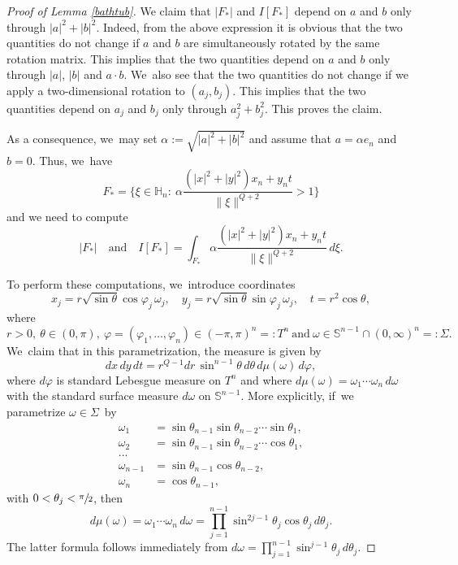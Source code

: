 \documentclass[11pt]{article}
\let\oldsfrac\sfrac
\renewcommand{\sfrac}[2]{{\oldsfrac{#1}{#2}}}
\theoremstyle{definition}
\let\phi\varphi
\newcommand{\1}{\mathbbm{1}}
\newcommand{\Sph}{\mathbb{S}}
\numberwithin{equation}{section}
\begin{document}
\begin{proof}[Proof of Lemma \ref{bathtub}]
We claim that $|F_*|$ and $I[F_*]$ depend on $a$ and $b$ only through $|a|^2+|b|^2$. Indeed, from the above expression it is obvious that the two quantities do not change if $a$ and $b$ are simultaneously rotated by the same rotation matrix. This implies that the two quantities depend on $a$ and $b$ only through $|a|$, $|b|$ and $a\cdot b$. We~also see that the two quantities do not change if we apply a two-dimensional rotation to $(a_j,b_j)$. This implies that the two quantities depend on $a_j$ and $b_j$ only through $a_j^2+b_j^2$. This proves the claim.

As a consequence, we~may set $\alpha:=\sqrt{|a|^2+|b|^2}$ and assume that $a=\alpha e_n$ and $b=0$. Thus, we~have
\[
F_* = \Big\{ \xi \in\mathbb H_n:\ \alpha \frac{(|x|^2+|y|^2)x_n + y_n t}{\|\xi\|^{Q+2}} >1 \Big\}
\]
and we need to compute
\[
|F_*|
\quad\text{and}\quad
I[F_*] = \int_{F_*} \alpha \frac{(|x|^2+|y|^2)x_n + y_n t}{\|\xi\|^{Q+2}} \,d\xi.
\]

To perform these computations, we~introduce coordinates
\[
x_j = r \sqrt{\sin\theta} \cos\phi_j \,\omega_j,
\quad
y_j = r \sqrt{\sin\theta} \sin\phi_j \,\omega_j,
\quad
t = r^2 \cos\theta,
\]
where
\[
r>0,\ \theta\in(0,\pi),\ \phi=(\phi_1,\ldots,\phi_n)\in(-\pi,\pi)^n=:T^n \ \text{and}\ \omega \in\Sph^{n-1}\cap(0,\infty)^n=:\Sigma.
\]
We~claim that in this parametrization, the measure is given by
\begin{equation}
\label{eq:measure}
dx\,dy\,dt = r^{Q-1}dr\,\sin^{n-1}\theta\,d\theta\,d\mu(\omega)\,d\phi,
\end{equation}
where $d\phi$ is standard Lebesgue measure on $T^n$ and where $d\mu(\omega) = \omega_1\cdots\omega_n\,d\omega$ with the standard surface measure $d\omega$ on $\Sph^{n-1}$. More explicitly, if~we parametrize \hbox{$\omega\in\Sigma$}~by
\begin{align*}
\omega_1 & = \sin\theta_{n-1} \sin\theta_{n-2} \cdots \sin\theta_1,\\
\omega_2 & = \sin\theta_{n-1} \sin\theta_{n-2} \cdots \cos\theta_1,\\
\ldots \\
\omega_{n-1} & = \sin\theta_{n-1} \cos\theta_{n-2},\\
\omega_n & = \cos\theta_{n-1},
\end{align*}
with $0<\theta_j<\sfrac\pi 2$, then
\[
d\mu(\omega) = \omega_1\cdots\omega_n\,d\omega = \prod_{j=1}^{n-1} \sin^{2j-1} \theta_j\cos\theta_j\,d\theta_j.
\]
The latter formula follows immediately from $d\omega = \prod_{j=1}^{n-1} \sin^{j-1}\theta_j\,d\theta_j$.


\end{proof}
\end{document}

